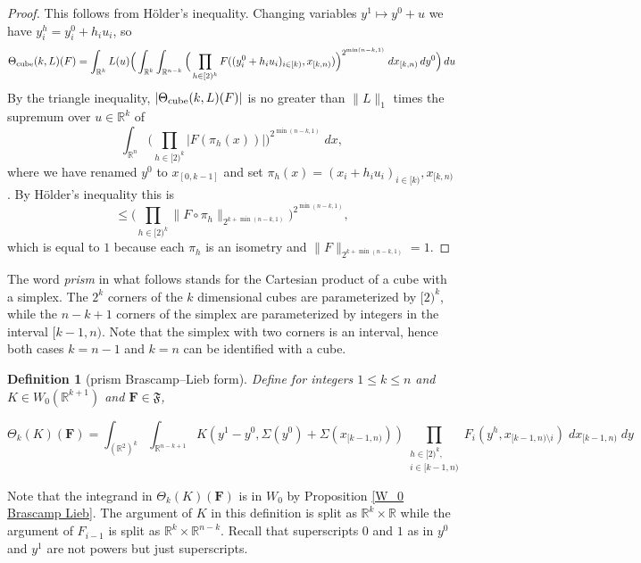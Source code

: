 \documentclass[12pt,reqno]{amsart}
\theoremstyle{plain}
\newtheorem{definition}[theorem]{Definition}
\numberwithin{equation}{section}
\theoremstyle{remark}
\newcommand{\uses}[1]{}
\newcommand{\usesdefs}[1]{}
\newcommand{\R}{{\mathbb R}}
\newcommand{\F}{\mathbf{F}}
\begin{document}
\begin{proof}
This follows from H\"older's inequality.
Changing variables $y^1\mapsto y^0 + u$ we have $y^h_i=y^0_i+h_i u_i$, so
\[ \Theta_{{\rm cube}}(k,L)(F) = \int_{\R^k} L(u) \Big(\int_{\R^k}\int_{\R^{n-k}} \Big(\prod_{h\in [2)^k} F((y^0_i+h_i u_i)_{i\in [k)}, x_{[k,n)})\Big)^{2^{\min(n-k,1)}}\;dx_{[k,n)}\,dy^0\Big)\,du \]
By the triangle inequality, $|\Theta_{{\rm cube}}(k,L)(F)|$ is no greater than $\|L\|_1$ times the supremum over $u\in\R^k$ of
\[ \int_{\R^n} \Big(\prod_{h\in [2)^k} |F(\pi_h(x))|\Big)^{2^{\min(n-k,1)}}\;dx, \]
where we have renamed $y^0$ to $x_{[0,k-1]}$
and set $\pi_h(x)=(x_i+h_i u_i)_{i\in [k)}, x_{[k,n)}$. By H\"older's inequality this is
\[ \le \Big(\prod_{h\in [2)^k} \|F\circ \pi_h\|_{2^{k+\min(n-k,1)}}\Big)^{2^{\min(n-k,1)}}, \]
which is equal to $1$ because each $\pi_h$ is an isometry and $\|F\|_{2^{k+\min(n-k,1)}}=1$.
\end{proof}


The word {\em prism} in what follows stands for the Cartesian product of a cube with a simplex.
The $2^k$ corners of the $k$ dimensional cubes are parameterized by $[2)^k$,
while the $n-k+1$ corners of the simplex are
parameterized by integers in the interval $[k-1,n)$.
Note that the simplex with two corners is an interval,
hence both cases $k=n-1$ and $k=n$ can be identified with a cube.


\begin{definition}[prism Brascamp--Lieb form]\label{prism Brascamp--Lieb}\uses{W_0 Brascamp Lieb}\usesdefs{auto:Wiener-space-definition,normalized function tuples}
Define for integers $1 \le k\le  n$
and  $K\in W_0(\R^{k+1})$ and $\F\in \mathfrak{F}$,


\begin{equation}\label{auto:K-kernel-form} \Theta_k(K)(\F) = \int_{(\R^{2})^k} \int_{\R^{n-k+1}} K(y^1-y^0, \Sigma(y^0) + \Sigma(x_{[k-1,n)}))
\prod_{\substack{h\in [2)^k,\\i\in [k-1,n)}} F_{i}( y^h, x_{[k-1,n)\setminus i})\;dx_{[k-1,n)}\;dy \end{equation}
\end{definition}

Note that the integrand in $\Theta_k(K)(\F)$ is in $W_0$ by Proposition \ref{W_0 Brascamp Lieb}.
The argument of $K$ in
this definition is split as $\R^{k}\times \R$
while
the argument of $F_{i-1}$  is split as $\R^{k}\times \R^{n-k}$. Recall that superscripts $0$ and $1$ as in $y^0$ and $y^1$ are not powers but just superscripts.
\end{document}
